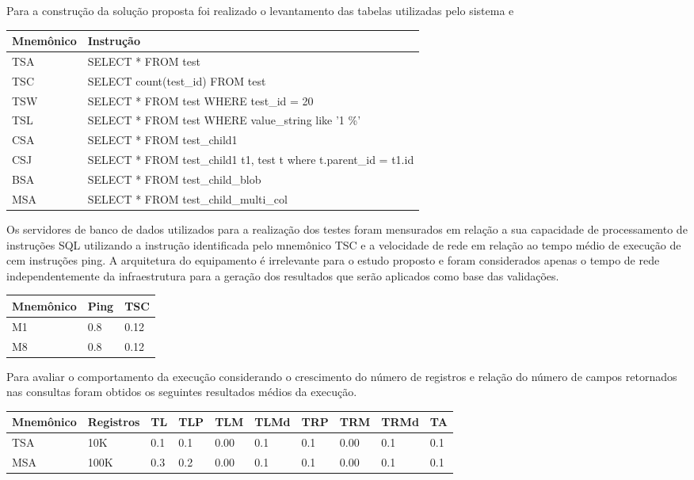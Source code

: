 \documentclass[12pt, a4paper]{article}
\begin{document}
Para a construção da solução proposta foi realizado o levantamento das tabelas utilizadas pelo sistema
e 

\begin{tabular}{l l}
\hline
Mnemônico & Instrução \\
\hline
TSA & SELECT * FROM test \\
TSC & SELECT count(test\_id) FROM test \\
TSW & SELECT * FROM test WHERE test\_id = 20\\
TSL & SELECT * FROM test WHERE value\_string like '1 \%'\\
CSA & SELECT * FROM test\_child1\\
CSJ & SELECT * FROM test\_child1 t1, test t where t.parent\_id = t1.id\\
BSA & SELECT * FROM test\_child\_blob\\
MSA & SELECT * FROM test\_child\_multi\_col\\
\hline
\end{tabular}

Os servidores de banco de dados utilizados para a realização dos testes foram mensurados em relação a
sua capacidade de processamento de instruções SQL utilizando a instrução identificada pelo mnemônico
TSC e a velocidade de rede em relação ao tempo médio de execução de cem instruções ping. A arquitetura
do equipamento é irrelevante para o estudo proposto e foram considerados apenas o tempo de rede independentemente
da infraestrutura para a geração dos resultados que serão aplicados como base das validações.

\begin{tabular}{l l l}
\hline
Mnemônico & Ping & TSC \\
\hline
M1 & 0.8 & 0.12 \\
M8 & 0.8 & 0.12 \\
\hline
\end{tabular}


Para avaliar o comportamento da execução considerando o crescimento do número de registros e relação do
número de campos retornados nas consultas foram obtidos os seguintes resultados médios da execução.

\begin{tabular}{l l l l l l l l l l}
\hline
Mnemônico & Registros & TL &TLP &TLM & TLMd & TRP & TRM & TRMd & TA \\
\hline
TSA & 10K & 0.1 & 0.1 & 0.00 & 0.1 & 0.1  & 0.00 & 0.1 & 0.1 \\
MSA & 100K & 0.3 & 0.2 & 0.00 & 0.1 & 0.1  & 0.00 & 0.1 & 0.1 \\

\hline
\end{tabular}
\end{document}
